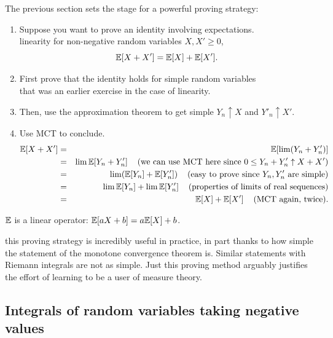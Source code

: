 \documentclass{article}
\begin{document}
The previous section sets the stage for a powerful proving strategy:
\begin{enumerate}
  \item Suppose you want to prove an identity involving expectations.\\ linearity for non-negative random variables $X, X' \ge 0$, \[ {\mathbb E}[X + X'] = {\mathbb E}[X] + {\mathbb E}[X']. \]
  \item First prove that the identity holds for simple random variables \\ that was an earlier exercise in the case of linearity.
  \item Then, use the approximation theorem to get simple $Y_n \uparrow X$ and $Y'_n \uparrow X'$. 
  \item Use MCT to conclude. \\
\begin{eqnarray*}
{\mathbb E}[X + X'] &=& {\mathbb E}[ \lim (Y_n + Y'_n) ] \\
&=& \lim {\mathbb E} [Y_n + Y'_n] \;\;\;\text{ (we can use MCT here since }0 \le Y_n + Y'_n \uparrow X + X'\text{)} \\
&=& \lim ( {\mathbb E}[Y_n] + {\mathbb E}[Y'_n] ) \;\;\;\text{ (easy to prove since }Y_n, Y'_n\text{ are simple)} \\
&=& \lim {\mathbb E}[Y_n] + \lim {\mathbb E}[Y'_n] \;\;\;\text{ (properties of limits of real sequences)} \\
&=& {\mathbb E}[X] + {\mathbb E}[X'] \;\;\;\text{ (MCT again, twice).}
\end{eqnarray*}
\end{enumerate}

 ${\mathbb E}$ is a linear operator: ${\mathbb E}[aX + b] = a{\mathbb E}[X] + b$.

 this proving strategy is incredibly useful in practice, in part thanks to how simple the statement of the monotone convergence theorem is. Similar statements with Riemann integrals are not as simple. Just this proving method arguably justifies the effort of learning to be a user of measure theory. 


\subsection{Integrals of random variables taking negative values}
\end{document}
